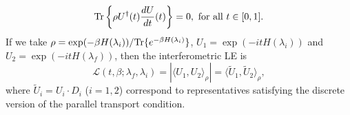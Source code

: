 \begin{equation*}
\text{Tr}\left\{ \rho U^{\dagger}(t)\frac{dU}{dt}(t)\right\}=0, \text{ for all } t\in[0,1].
\end{equation*}
If we take $\rho=\exp(-\beta H(\lambda_i))/\text{Tr}\{e^{-\beta H(\lambda_i)}\}$, $U_1=\exp(-it H(\lambda_i))$ and $U_2=\exp(-it H(\lambda_f))$, then the interferometric LE is
\begin{equation*}
\mathcal{L}(t,\beta;\lambda_f,\lambda_i)=|\langle U_1,U_2\rangle_{\rho}|=\langle \widetilde{U}_1, \widetilde{U}_2\rangle_{\rho},
\end{equation*}
where $\widetilde{U}_i=U_i\cdot D_i$ ($i=1,2$) correspond to representatives satisfying the discrete version of the parallel transport condition.


%	
%
%
%
%
%
%